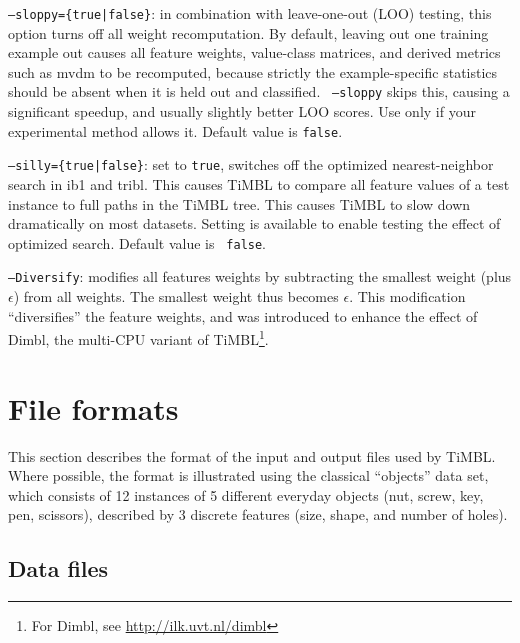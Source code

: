 \documentclass{report}
\begin{document}
\begin{description}
\item {\tt --sloppy=\{true|false\}}: in combination with leave-one-out
  (LOO) testing, this option turns off all weight recomputation. By
  default, leaving out one training example out causes all feature
  weights, value-class matrices, and derived metrics such as {\sc
    mvdm} to be recomputed, because strictly the example-specific
  statistics should be absent when it is held out and classified. {\tt
    --sloppy} skips this, causing a significant speedup, and usually
  slightly better LOO scores. Use only if your experimental method
  allows it. Default value is {\tt false}.
\item {\tt --silly=\{true|false\}}: set to {\tt true}, switches off
  the optimized nearest-neighbor search in {\sc ib1} and {\sc
    tribl}. This causes TiMBL to compare all feature values of a test
  instance to full paths in the TiMBL tree. This causes TiMBL to slow
  down dramatically on most datasets. Setting is available to enable
  testing the effect of optimized search. Default value is {\tt
    false}.
\item{\tt --Diversify}: modifies all features weights by subtracting
  the smallest weight (plus $\epsilon$) from all weights. The smallest
  weight thus becomes $\epsilon$. This modification ``diversifies''
  the feature weights, and was introduced to enhance the effect of
  {\sc Dimbl}, the multi-CPU variant of TiMBL\footnote{For {\sc
      Dimbl}, see \url{http://ilk.uvt.nl/dimbl}}.
\end{description}

\section{File formats}
\label{fileformats}

This section describes the format of the input and output files used
by TiMBL. Where possible, the format is illustrated using the
classical ``objects'' data set, which consists of 12 instances of 5
different everyday objects (nut, screw, key, pen, scissors), described
by 3 discrete features (size, shape, and number of holes).

\subsection{Data files}
\label{dataformats}
\end{document}
